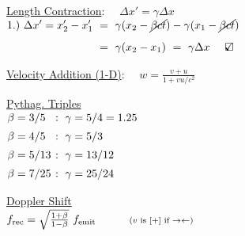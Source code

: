 \documentclass[12pt]{article}
\newcommand{\checkedbox}{\mbox{\ooalign{$\checkmark$\cr\hidewidth$\square$\hidewidth\cr}}} %
\begin{document}
\vspace{20pt}\noindent
\begin{minipage}[t]{.54\textwidth}
	\underline{Length Contraction}: \ \ \(\boxed{ \Delta x' = \gamma \Delta x }\)\\[10pt]
	\indent \(1.)\ \begin{aligned}[t]
		\Delta x' = x'_2 - x'_1 \ &= \ \gamma (x_2 - \cancel{\beta ct}) - \gamma (x_1 - \cancel{\beta ct}) \\[5pt]
			&=\ \gamma (x_2 - x_1) \ =\ \gamma \Delta x \ \ \ \ \checkedbox
	\end{aligned}\)

	\vspace{20pt}\noindent
	\underline{Velocity Addition (1-D)}: \ \ \(\boxed{ w = \frac{v + u}{1 + vu/c^2} }\)	
\end{minipage}
\begin{minipage}[t]{.45\textwidth}
	\setlength{\parindent}{.5cm}
	\noindent
	\underline{Pythag. Triples}\\[5pt]
	\indent \(\setlength{\arraycolsep}{.3pt} \begin{array}[t]{l l}
		\beta = 3/5 	&\ :\ \gamma = 5/4 = 1.25\\[5pt]
		\beta = 4/5 	&\ :\ \gamma = 5/3\\[5pt]
		\beta = 5/13 	&\ :\ \gamma = 13/12\\[5pt]
		\beta = 7/25	&\ :\ \gamma = 25/24
	\end{array}\)

	\vspace{15pt}\noindent
	\underline{Doppler Shift}\\[5pt]
	\(f_\text{rec} = \sqrt{\frac{1+\beta}{1-\beta}}\ f_\text{emit} 
		\indent\indent {\scriptstyle(v \text{ is } [+] \text{ if } \rightarrow \leftarrow)}\)

\end{minipage}

\newpage
\end{document}

